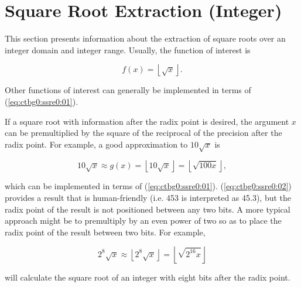 \section{Square Root Extraction (Integer)}
\label{ctbg0:ssre0}

This section presents information about the extraction of
square roots over an integer domain and integer range.  Usually, the function
of interest is

\begin{equation}
\label{eq:ctbg0:ssre0:01}
f(x) = \left\lfloor \sqrt{x} \right\rfloor .
\end{equation}

Other functions of interest can generally be implemented in terms
of (\ref{eq:ctbg0:ssre0:01}).

If a square root with information after the radix point is desired, the argument $x$ can be premultiplied
by the square of the reciprocal of the precision after the radix point.  For example,
a good approximation to $10 \sqrt{x}$ is

\begin{equation}
\label{eq:ctbg0:ssre0:02}
10 \sqrt{x} \approx g(x) = \left\lfloor 10 \sqrt{x} \right\rfloor
                         = \left\lfloor \sqrt{100 x} \right\rfloor ,
\end{equation}

\noindent{}which can be implemented in terms of (\ref{eq:ctbg0:ssre0:01})\@.
(\ref{eq:ctbg0:ssre0:02}) provides a result that is human-friendly (i.e. 453 is
interpreted as 45.3), but the radix point of the result is not positioned between
any two bits.  A more typical approach might be to premultiply by an even
power of two so as to place the radix point of the result between two bits.
For example,

\begin{equation}
\label{eq:ctbg0:ssre0:02b}
2^8 \sqrt{x}       \approx \left\lfloor 2^8 \sqrt{x} \right\rfloor
                         = \left\lfloor \sqrt{2^{16} x} \right\rfloor 
\end{equation}

\noindent{}will calculate the square root of an integer
with eight bits after the radix point.

